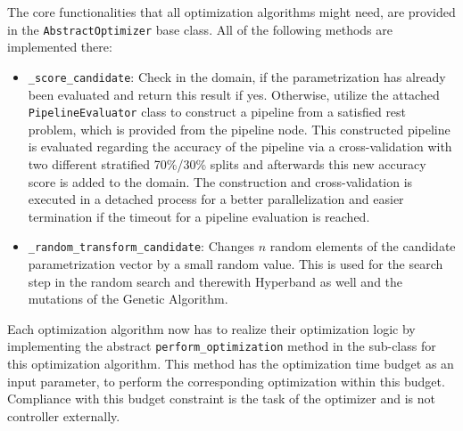 The core functionalities that all optimization algorithms might need, are provided in the \texttt{AbstractOptimizer} base class.
All of the following methods are implemented there:
\begin{itemize}
    \item \texttt{\_score\_candidate}: Check in the domain, if the parametrization has already been evaluated and return this result if yes.
    Otherwise, utilize the attached \texttt{PipelineEvaluator} class to construct a pipeline from a satisfied rest problem, which is provided from the pipeline node.
    This constructed pipeline is evaluated regarding the accuracy of the pipeline via a cross-validation with two different stratified 70\%/30\% splits and afterwards this new accuracy score is added to the domain.
    The construction and cross-validation is executed in a detached process for a better parallelization and easier termination if the timeout for a pipeline evaluation is reached.
    \item \texttt{\_random\_transform\_candidate}: Changes $n$ random elements of the candidate parametrization vector by a small random value.
    This is used for the search step in the random search and therewith Hyperband as well and the mutations of the Genetic Algorithm.
\end{itemize}
Each optimization algorithm now has to realize their optimization logic by implementing the abstract \texttt{perform\_optimization} method in the sub-class for this optimization algorithm.
This method has the optimization time budget as an input parameter, to perform the corresponding optimization within this budget.
Compliance with this budget constraint is the task of the optimizer and is not controller externally.


